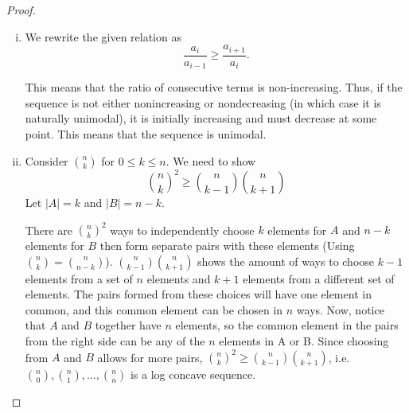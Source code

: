 \documentclass[11pt]{scrartcl}
\begin{document}
\begin{proof}
    \begin{enumerate}[(i)]
        \item We rewrite the given relation as 
        \[
            \frac{a_i}{a_{i-1}} \ge \frac{a_{i+1}}{a_i}.
        \]
        
        This means that the ratio of consecutive terms is non-increasing. Thus, if the sequence is not either nonincreasing or nondecreasing (in which case it is naturally unimodal), it is initially increasing and must decrease at some point. This means that the sequence is unimodal.
        \item Consider $\binom{n}{k}$ for $0 \leq k \leq n$. We need to show \[\binom{n}{k}^2 \geq \binom{n}{k-1} \binom{n}{k+1}\]
        Let $|A|=k$ and $|B|=n-k$.

        There are $\binom{n}{k}^2$ ways to independently choose $k$ elements for $A$ and $n-k$ elements for $B$ then form separate pairs with these elements (Using $\binom{n}{k} = \binom{n}{n-k}$).
        $\binom{n}{k-1} \binom{n}{k+1}$ shows the amount of ways to choose $k-1$ elements from a set of $n$ elements and $k+1$ elements from a different set of elements. The pairs formed from these choices will have one element in common, and this common element can be chosen in $n$ ways.
        Now, notice that $A$ and $B$ together have $n$ elements, so the common element in the pairs from the right side can be any of the $n$ elements in A or B. Since choosing from $A$ and $B$ allows for more pairs, $\binom{n}{k}^2 \geq \binom{n}{k-1} \binom{n}{k+1}$, i.e. $\binom{n}{0}, \binom{n}{1},\ldots, \binom{n}{n}$ is a log concave sequence.

    \end{enumerate}
\end{proof}
\end{document}
